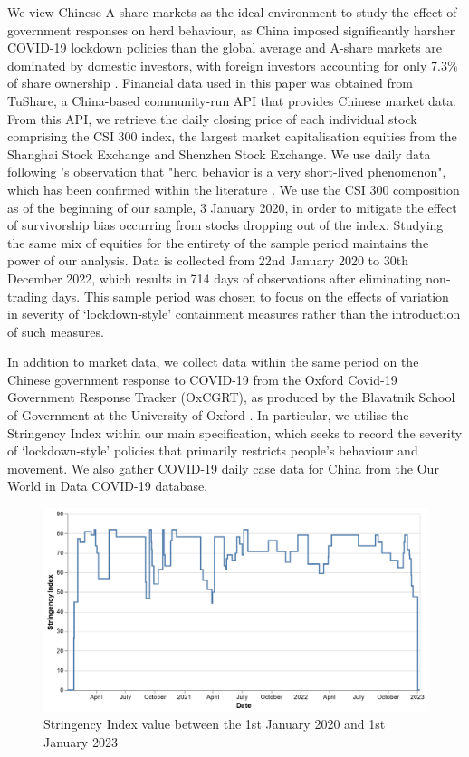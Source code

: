 \documentclass[12pt]{article}
\numberwithin{table}{section}   %
\begin{document}
We view Chinese A-share markets as the ideal environment to study the effect of government responses on herd behaviour, as China imposed significantly harsher COVID-19 lockdown policies than the global average \citep{OxCGRT} and A-share markets are dominated by domestic investors, with foreign investors accounting for only 7.3\% of share ownership \citep{ubs}. Financial data used in this paper was obtained from TuShare, a China-based community-run API that provides Chinese market data. From this API, we retrieve the daily closing price of each individual stock comprising the CSI 300 index, the largest market capitalisation equities from the Shanghai Stock Exchange and Shenzhen Stock Exchange. We use daily data following \citet{ch}'s observation that "herd behavior is a very short-lived phenomenon", which has been confirmed within the literature \citep{tan}. We use the CSI 300 composition as of the beginning of our sample, 3 January 2020, in order to mitigate the effect of survivorship bias occurring from stocks dropping out of the index. Studying the same mix of equities for the entirety of the sample period maintains the power of our analysis. Data is collected from 22nd January 2020 to 30th December 2022, which results in 714 days of observations after eliminating non-trading days. This sample period was chosen to focus on the effects of variation in severity of ‘lockdown-style’ containment measures rather than the introduction of such measures.

In addition to market data, we collect data within the same period on the Chinese government response to COVID-19 from the Oxford Covid-19 Government Response Tracker (OxCGRT), as produced by the Blavatnik School of Government at the University of Oxford \citep{OxCGRT}. In particular, we utilise the Stringency Index within our main specification, which seeks to record the severity of ‘lockdown-style’ policies that primarily restricts people’s behaviour and movement. We also gather COVID-19 daily case data for China from the Our World in Data COVID-19 database.

\begin{figure}
    \centering
    \small
    \includegraphics[scale=0.4]{graphics/stringency_line.png}
    \caption{Stringency Index value between the 1st January 2020 and 1st January 2023}
    \label{fig:stringency_line}
\end{figure}
\end{document}
